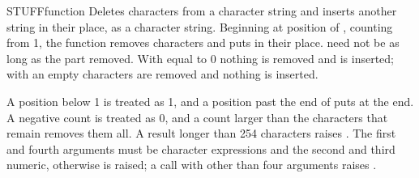 \begin{XbaseEntry}{STUFF}{function}
Deletes characters from a character string and inserts another string in their place, as a character string.
\Syntax
{}
\Usage
Beginning at position  of , counting from 1, the function removes  characters and puts  in their place.  need not be as long as the part removed. With  equal to 0 nothing is removed and  is inserted; with an empty  characters are removed and nothing is inserted.

A position below 1 is treated as 1, and a position past the end of  puts  at the end. A negative count is treated as 0, and a count larger than the characters that remain removes them all. A result longer than 254 characters raises . The first and fourth arguments must be character expressions and the second and third numeric, otherwise  is raised; a call with other than four arguments raises .
\Examples
{}
\end{XbaseEntry}

